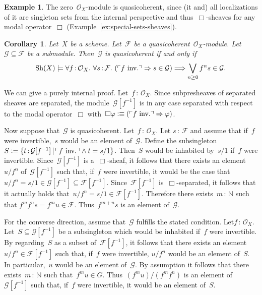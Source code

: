 \documentclass[10pt,reqno,a4paper]{amsbook}
\makeatletter
\theoremstyle{definition}
\newtheorem{ex}[defn]{Example}
\theoremstyle{plain}
\newtheorem{cor}[defn]{Corollary}
\theoremstyle{remark}
\newcommand{\F}{\mathcal{F}}
\renewcommand{\G}{\mathcal{G}}
\renewcommand{\O}{\mathcal{O}}
\newcommand{\NN}{\mathbb{N}}
\newcommand{\Sh}{\mathrm{Sh}}
\newcommand{\?}{\,{:}\,}
\renewcommand{\_}{\mathpunct{.}\,}
\newcommand{\speak}[1]{\ulcorner\text{\textnormal{#1}}\urcorner}
\newcommand{\inv}{inv.\@}
\newcommand{\defeq}{\vcentcolon=}
\newcommand{\defequiv}{\vcentcolon\equiv}
\renewenvironment{proof}[1][\proofname]{\par
  \pushQED{\qed}%
  \normalfont \topsep6\p@\@plus6\p@\relax
  \trivlist
  \item[\hskip\labelsep
        \itshape
    #1\@addpunct{.}]\ignorespaces
}{%
  \popQED\endtrivlist\@endpefalse
}
\makeatother
\begin{document}
\begin{ex}The zero~$\O_X$-module is quasicoherent, since (it and) all
localizations of it are singleton sets from the internal perspective and
thus~$\Box$-sheaves for any modal operator~$\Box$
(Example~\ref{ex:special-sets-sheaves}).\end{ex}

\begin{cor}\label{cor:submodule-qcoh}
Let~$X$ be a scheme. Let~$\F$ be a quasicoherent~$\O_X$-module.
Let~$\G \subseteq \F$ be a submodule. Then~$\G$ is quasicoherent if and only
if
\[ \Sh(X) \models \forall f\?\O_X\_
  \forall s\?\F\_
  (\speak{$f$ \inv} \Rightarrow s \in \G) \Longrightarrow
  \bigvee_{n \geq 0} f^n s \in \G. \]
\end{cor}
\begin{proof}We can give a purely internal proof. Let~$f\?\O_X$.
Since subpresheaves of separated sheaves are separated, the module~$\G[f^{-1}]$
is in any case separated with respect to the modal operator~$\Box$
with~$\Box\varphi \defequiv (\speak{$f$ \inv} \Rightarrow \varphi)$.

Now suppose that~$\G$ is quasicoherent. Let~$f\?\O_X$. Let $s\?\F$ and assume that
if~$f$ were invertible,~$s$ would be an element of~$\G$. Define the
subsingleton~$S \defeq \{ t\?\G[f^{-1}] \,|\, \speak{$f$ \inv} \wedge t=s/1 \}$.
Then~$S$ would be inhabited by~$s/1$ if~$f$ were invertible. Since~$\G[f^{-1}]$
is a~$\Box$-sheaf, it follows that there exists an element~$u/f^n$ of~$\G[f^{-1}]$
such that, if~$f$ were invertible, it would be the case that~$u/f^n = s/1 \in
\G[f^{-1}] \subseteq \F[f^{-1}]$.
Since~$\F[f^{-1}]$ is~$\Box$-separated, it follows that it actually holds that~$u/f^n
= s/1 \in \F[f^{-1}]$. Therefore there exists~$m\?\NN$ such that $f^m f^n s =
f^m u \in \F$. Thus~$f^{m+n} s$ is an element of~$\G$.

For the converse direction, assume that~$\G$ fulfills the stated condition.
Let$f\?\O_X$. Let~$S \subseteq \G[f^{-1}]$ be a subsingleton which would be
inhabited if~$f$ were invertible. By regarding~$S$ as a subset of~$\F[f^{-1}]$,
it follows that there exists an element~$u/f^n \in \F[f^{-1}]$ such that,
if~$f$ were invertible, $u/f^n$ would be an element of~$S$. In particular,~$u$
would be an element of~$\G$. By assumption
it follows that there exists~$m\?\NN$ such that~$f^m u \in G$. Thus~$(f^m u) /
(f^m f^n)$ is an element of~$\G[f^{-1}]$ such that, if~$f$ were invertible, it
would be an element of~$S$.
\end{proof}
\end{document}
